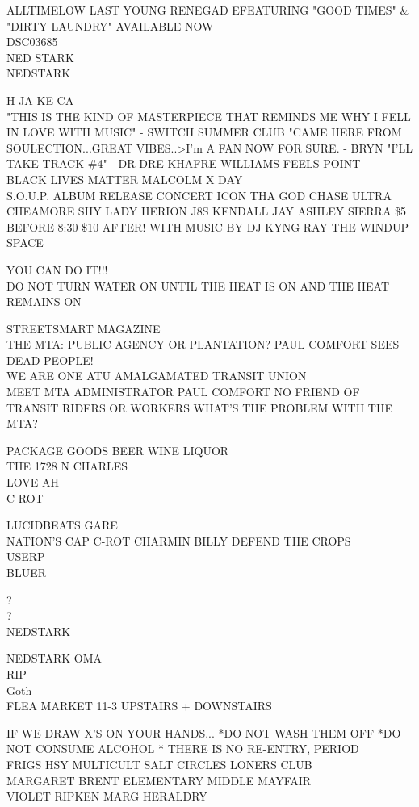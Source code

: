 \documentclass[10pt,letterpaper]{article}
\begin{document}
ALLTIMELOW LAST YOUNG RENEGAD EFEATURING "GOOD TIMES" \& "DIRTY LAUNDRY" AVAILABLE NOW\\
DSC03685\\
NED STARK\\
NEDSTARK

H JA KE CA\\
"THIS IS THE KIND OF MASTERPIECE THAT REMINDS ME WHY I FELL IN LOVE WITH MUSIC" {-} SWITCH SUMMER CLUB "CAME HERE FROM SOULECTION...GREAT VIBES..>I'm A FAN NOW FOR SURE.  {-} BRYN "I'LL TAKE TRACK \#4" {-} DR DRE KHAFRE WILLIAMS FEELS POINT\\
BLACK LIVES MATTER MALCOLM X DAY\\
S.O.U.P. ALBUM RELEASE CONCERT ICON THA GOD CHASE ULTRA CHEAMORE SHY LADY HERION J8S KENDALL JAY ASHLEY SIERRA \$5 BEFORE 8:30 \$10 AFTER!  WITH MUSIC BY DJ KYNG RAY THE WINDUP SPACE

YOU CAN DO IT!!!\\
DO NOT TURN WATER ON UNTIL THE HEAT IS ON AND THE HEAT REMAINS ON

STREETSMART MAGAZINE\\
THE MTA: PUBLIC AGENCY OR PLANTATION?  PAUL COMFORT SEES DEAD PEOPLE!\\
WE ARE ONE ATU AMALGAMATED TRANSIT UNION\\
MEET MTA ADMINISTRATOR PAUL COMFORT NO FRIEND OF TRANSIT RIDERS OR WORKERS WHAT'S THE PROBLEM WITH THE MTA?

PACKAGE GOODS BEER WINE LIQUOR\\
THE 1728 N CHARLES\\
LOVE AH\\
C{-}ROT

LUCIDBEATS GARE\\
NATION'S CAP C{-}ROT CHARMIN BILLY DEFEND THE CROPS\\
USERP\\
BLUER

?\\
?\\
NEDSTARK

NEDSTARK OMA\\
RIP\\
Goth\\
FLEA MARKET 11{-}3 UPSTAIRS + DOWNSTAIRS

IF WE DRAW X'S ON YOUR HANDS... *DO NOT WASH THEM OFF *DO NOT CONSUME ALCOHOL * THERE IS NO RE{-}ENTRY, PERIOD\\
FRIGS HSY MULTICULT SALT CIRCLES LONERS CLUB\\
MARGARET BRENT ELEMENTARY MIDDLE MAYFAIR\\
VIOLET RIPKEN MARG HERALDRY
\end{document}
